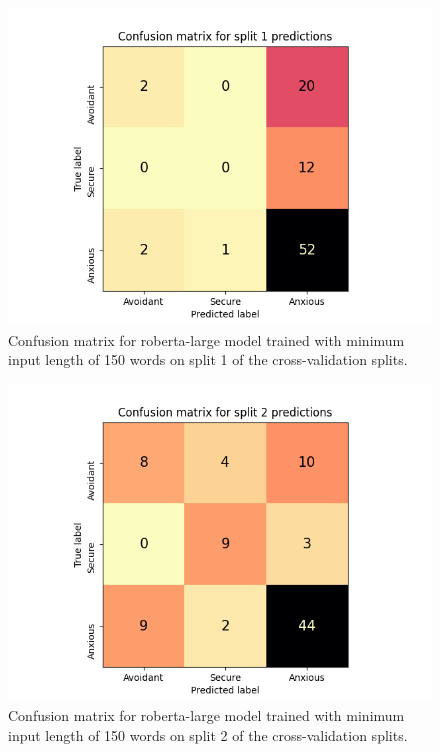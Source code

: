 \documentclass[12pt]{report}
\begin{document}
\begin{figure}
    \includegraphics[width=\textwidth]{figures/roberta-large_150_split1_confusion_matrix.png}
    \caption{Confusion matrix for roberta-large model trained with minimum input length of 150 words on split 1 of the cross-validation splits.}
    \label{fig: cm split1}
\end{figure}

\begin{figure}
    \includegraphics[width=\textwidth]{figures/roberta-large_150_split2_confusion_matrix.png}
    \caption{Confusion matrix for roberta-large model trained with minimum input length of 150 words on split 2 of the cross-validation splits.}
    \label{fig: cm split2}
\end{figure}
\end{document}
